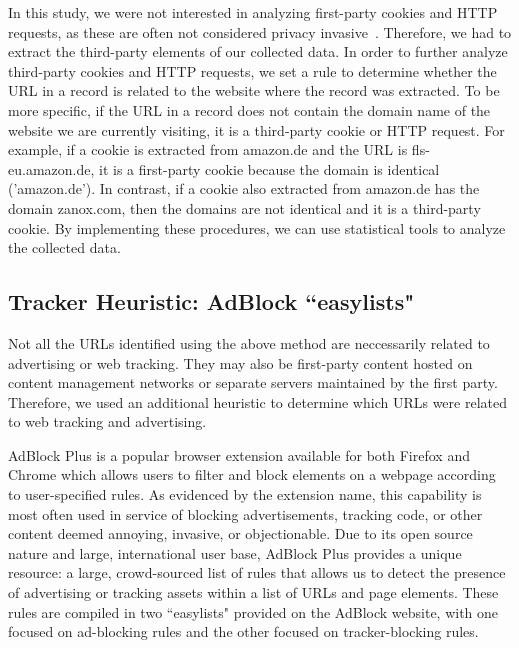 \documentclass[conference]{IEEEtran}
\begin{document}
In this study, we were not interested in analyzing first-party cookies and HTTP requests, as these are often not considered privacy invasive~\cite{mcdonald2011track}. Therefore, we had to extract the third-party elements of our collected data. In order to further analyze third-party cookies and HTTP requests, we set a rule to determine whether the URL in a record is related to the website where the record was extracted. To be more specific, if the URL in a record does not contain the domain name of the website we are currently visiting, it is a third-party cookie or HTTP request. For example, if a cookie is extracted from amazon.de and the URL is fls-eu.amazon.de, it is a first-party cookie because the domain is identical ('amazon.de'). In contrast, if a cookie also extracted from amazon.de has the domain zanox.com, then the domains are not identical and it is a third-party cookie. By implementing these procedures, we can use statistical tools to analyze the collected data.

\subsection{Tracker Heuristic: AdBlock ``easylists"}

Not all the URLs identified using the above method are neccessarily related to advertising or web tracking.  They may also be first-party content hosted on content management networks or separate servers maintained by the first party.  Therefore, we used an additional heuristic to determine which URLs were related to web tracking and advertising.  

AdBlock Plus \cite{adblock} is a popular browser extension available for both Firefox and Chrome which allows users to filter and block elements on a webpage according to user-specified rules. As evidenced by the extension name, this capability is most often used in service of blocking advertisements, tracking code, or other content deemed annoying, invasive, or objectionable. Due to its open source nature and large, international user base, AdBlock Plus provides a unique resource: a large, crowd-sourced list of rules that allows us to detect the presence of advertising or tracking assets within a list of URLs and page elements. These rules are compiled in two ``easylists"  \cite{easylist} provided on the AdBlock website, with one focused on ad-blocking rules and the other focused on tracker-blocking rules.
\end{document}
